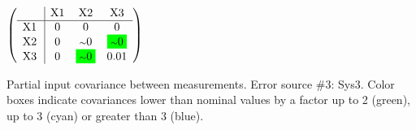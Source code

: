 \begin{table}[H]
\scriptsize
\begin{center}
\renewcommand{\arraystretch}{1.1}
\begin{math}\left(\begin{array}{c|ccc}
 & \mathrm{X1} & 
\mathrm{X2} & 
\mathrm{X3} \\
\hline
\mathrm{X1} \hspace*{2pt} &  0 &  0 &  0 \\
\mathrm{X2} \hspace*{2pt} &  0 &  {\scriptstyle \sim }0 &  \colorbox{Green1}{$ {\scriptstyle \sim }0$} \\
\mathrm{X3} \hspace*{2pt} &  0 &  \colorbox{Green1}{$ {\scriptstyle \sim }0$} &       0.01 \\
\end{array}\right)\end{math}
\caption{Partial input covariance between measurements. Error source \#3: Sys3. Color boxes indicate covariances lower than nominal values by a factor up to 2 (green), up to 3 (cyan) or greater than 3 (blue).}
\renewcommand{\arraystretch}{1}
\end{center}
\end{table}
\clearpage
